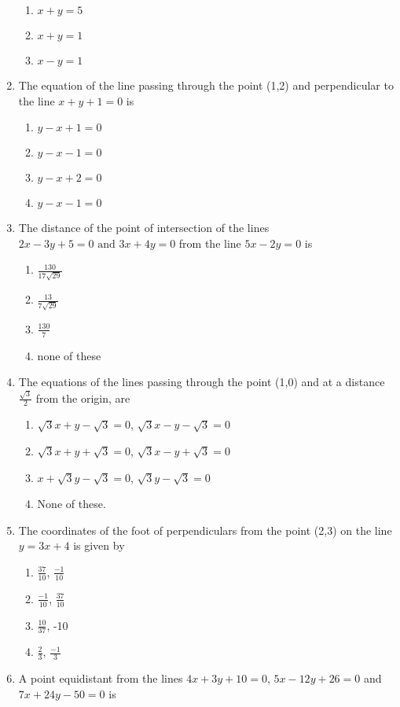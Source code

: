 \begin{enumerate}[label=\thesubsection.\arabic*,ref=\thesubsection.\theenumi]
\begin{enumerate}
\item $x+y=5$
\item $x+y=1$
\item $x-y=1$
\end{enumerate}
\item The equation of the line passing through the point (1,2) and perpendicular to the line $x+y+1=0$ is
\begin {enumerate}
\item $y-x+1=0$
\item $y-x-1=0$
\item $y-x+2=0$
\item $y-x-1=0$
\end{enumerate}
\item The distance of the point of intersection of the lines $2x-3y+5=0 \text{ and }3x+4y=0$ from the line $5x-2y=0$ is
\begin{enumerate}
\item $\frac{130}{17\sqrt{29}}$
\item $\frac{13}{7\sqrt{29}}$
\item $\frac{130}{7}$
\item none of these
\end{enumerate}
\item The equations of the lines passing through the point (1,0) and at a distance $\frac{\sqrt{3}}{2}$ from the origin, are 
\begin{enumerate}
\item $\sqrt{3}x+y-\sqrt{3}=0$, $\sqrt{3}x-y-\sqrt{3}=0$
\item $\sqrt{3}x+y+\sqrt{3}=0$, $\sqrt{3}x-y+\sqrt{3}=0$
\item $x+\sqrt{3}y-\sqrt{3}=0$, $\sqrt{3}y-\sqrt{3}=0$
\item None of these.
\end{enumerate}
\item The coordinates of the foot of perpendiculars from the point (2,3) on the line $y=3x+4$ is given by 
\begin{enumerate} 
\item $\frac{37}{10}$, $\frac{-1}{10}$
\item $\frac{-1}{10}$, $\frac{37}{10}$
\item $\frac{10}{37}$, -10
\item $\frac{2}{3}$, $\frac{-1}{3}$
\end{enumerate}
\item A point equidistant from the lines $4x+3y+10=0$, $5x-12y+26=0$ and $7x+24y-50=0$ is
\begin{enumerate}

\end{enumerate}
\end{enumerate}
